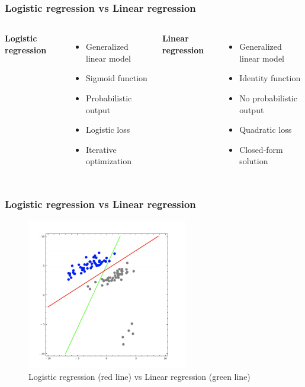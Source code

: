 \documentclass{beamer}
\begin{document}
\begin{frame}
	\frametitle{Logistic regression vs Linear regression}	
	
	\begin{columns}[c] %
		
		\textbf{Logistic regression}
		\begin{itemize}
			\item Generalized linear model
			\item Sigmoid function
			\item Probabilistic output
			\item Logistic loss
			\item Iterative optimization
		\end{itemize} 
		
	\textbf{Linear regression}
	\begin{itemize}
		\item Generalized linear model
		\item Identity function
		\item No probabilistic output
		\item Quadratic loss
		\item Closed-form solution
	\end{itemize} 
	\end{columns}	
\end{frame}

\begin{frame}
	\frametitle{Logistic regression vs Linear regression}	
	\begin{figure}[h]
		\centering
		\includegraphics[width=7cm]{logistic}
		\caption{Logistic regression (red line) vs Linear regression (green line)}
	\end{figure}
	
\end{frame}
\end{document}

